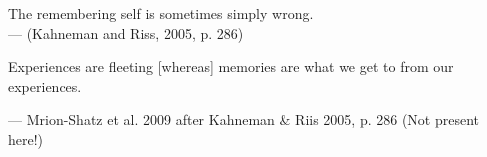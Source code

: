 
\thispagestyle{empty}


\vspace*{3cm}

\begin{center}
The remembering self is sometimes simply wrong. \\ \medskip
--- (Kahneman and Riss, 2005, p. 286)
\end{center}

\medskip

\begin{center}
Experiences are fleeting [whereas] memories are what we get to from our experiences. \\ \medskip

--- Mrion-Shatz et al. 2009 after Kahneman & Riis 2005, p. 286 (Not present here!)
\end{center}
